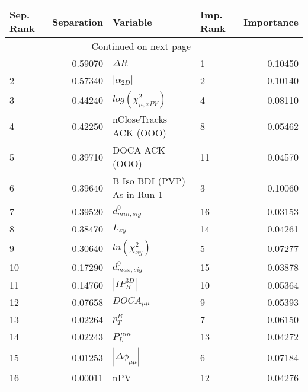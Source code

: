 \usepackage{lscape}

\begin{landscape}
\begin{longtable}{lrllr}
\toprule
Sep. Rank &  Separation &                     Variable & Imp. Rank &  Importance \\
\midrule
\endhead
\midrule
\multicolumn{3}{r}{{Continued on next page}} \\
\midrule
\endfoot

\bottomrule
\endlastfoot
        1 &     0.59070 &                   $\Delta R$ &         1 &     0.10450 \\
        2 &     0.57340 &              $|\alpha_{2D}|$ &         2 &     0.10140 \\
        3 &     0.44240 &    $log(\chi^{2}_{\mu,xPV})$ &         4 &     0.08110 \\
        4 &     0.42250 &       nCloseTracks ACK (OOO) &         8 &     0.05462 \\
        5 &     0.39710 &               DOCA ACK (OOO) &        11 &     0.04570 \\
        6 &     0.39640 &  B Iso BDI (PVP) As in Run 1 &         3 &     0.10060 \\
        7 &     0.39520 &             $d^0_{min, sig}$ &        16 &     0.03153 \\
        8 &     0.38470 &                     $L_{xy}$ &        14 &     0.04261 \\
        9 &     0.30640 &          $ln(\chi^{2}_{xy})$ &         5 &     0.07277 \\
       10 &     0.17290 &             $d^0_{max, sig}$ &        15 &     0.03878 \\
       11 &     0.14760 &              $|IP_{B}^{3D}|$ &        10 &     0.05364 \\
       12 &     0.07658 &              $DOCA_{\mu\mu}$ &         9 &     0.05393 \\
       13 &     0.02264 &                    $p^B_{T}$ &         7 &     0.06150 \\
       14 &     0.02243 &                $P^{min}_{L}$ &        13 &     0.04272 \\
       15 &     0.01253 &     $|\Delta \phi_{\mu\mu}|$ &         6 &     0.07184 \\
       16 &     0.00011 &                          nPV &        12 &     0.04276 \\
\end{longtable}

\end{landscape}
